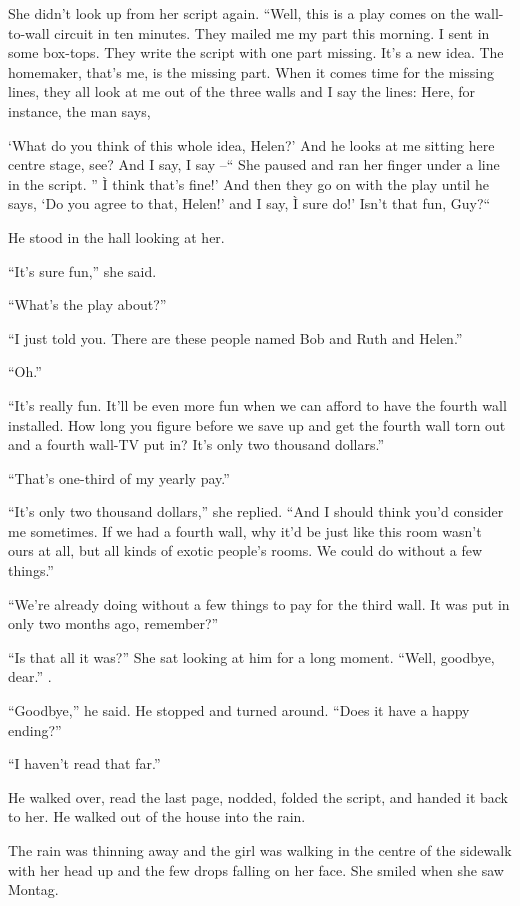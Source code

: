 \documentclass[11pt,openany]{book}
\begin{document}
She didn't look up from her script again. ``Well, this is a play comes on the wall-to-wall circuit in ten minutes. They mailed me my part this morning. I sent in some box-tops. They write the script with one part missing. It's a new idea. The homemaker, that's me, is the missing part. When it comes time for the missing lines, they all look at me out of the three walls and I say the lines: Here, for instance, the man says,

`What do you think of this whole idea, Helen?' And he looks at me sitting here centre stage, see? And I say, I say --`` She paused and ran her finger under a line in the script. '' Ì think that's fine!' And then they go on with the play until he says, `Do you agree to that, Helen!' and I say, Ì sure do!' Isn't that fun, Guy?``

He stood in the hall looking at her.

``It's sure fun,'' she said.

``What's the play about?''

``I just told you. There are these people named Bob and Ruth and Helen.''

``Oh.''

``It's really fun. It'll be even more fun when we can afford to have the fourth wall installed. How long you figure before we save up and get the fourth wall torn out and a fourth wall-TV put in? It's only two thousand dollars.''

``That's one-third of my yearly pay.''

``It's only two thousand dollars,'' she replied. ``And I should think you'd consider me sometimes. If we had a fourth wall, why it'd be just like this room wasn't ours at all, but all kinds of exotic people's rooms. We could do without a few things.''

``We're already doing without a few things to pay for the third wall. It was put in only two months ago, remember?''

``Is that all it was?'' She sat looking at him for a long moment. ``Well, goodbye, dear.'' .

``Goodbye,'' he said. He stopped and turned around. ``Does it have a happy ending?''

``I haven't read that far.''

He walked over, read the last page, nodded, folded the script, and handed it back to her. He walked out of the house into the rain.

The rain was thinning away and the girl was walking in the centre of the sidewalk with her head up and the few drops falling on her face. She smiled when she saw Montag.
\end{document}
